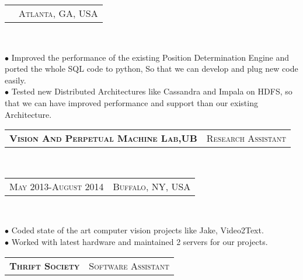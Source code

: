 \documentclass[10pt,a4paper,oneside]{article}
\begin{document}
\begin{minipage}[t]{0.63\textwidth}
{\begin{tabular}{c|c}
               &{\small A\textsc{tlanta}, GA, USA}
            \end{tabular}
        }\\ 
        \vspace{-4mm}
        \begin{adjustwidth}{7pt}{0pt}
            {\footnotesize $\bullet$ Improved the performance of the existing Position Determination Engine and ported the whole SQL code to python, So that we can develop and plug new code easily.\\
            $\bullet$ Tested new Distributed Architectures like Cassandra and Impala on HDFS, so that we can have improved performance and support than our existing Architecture.}\\
        \end{adjustwidth}
        \begin{tabular}{c|c}
            \textbf{\normalsize V\textsc{ision} A\textsc{nd} P\textsc{erpetual} M\textsc{achine} L\textsc{ab},UB}
            &\textmd{\normalsize R\textsc{esearch} A\textsc{ssistant}}
        \end{tabular}\\
        \textcolor{light-gray}{
            \begin{tabular}{c|c}
                {\small M\textsc{ay 2013}-A\textsc{ugust 2014}}
               &{\small B\textsc{uffalo}, NY, USA}
            \end{tabular}
        }\\ 
        \vspace{-4mm}
        \begin{adjustwidth}{7pt}{0pt}
            {\footnotesize $\bullet$ Coded state of the art computer vision projects like Jake, Video2Text.\\
            $\bullet$ Worked with latest hardware and maintained 2 servers for our projects.}\\
        \end{adjustwidth}
        \begin{tabular}{c|c}
            \textbf{\normalsize T\textsc{hrift} S\textsc{ociety}}
            &\textmd{\normalsize S\textsc{oftware} A\textsc{ssistant}}
        \end{tabular}\\

\end{minipage}
\end{document}
